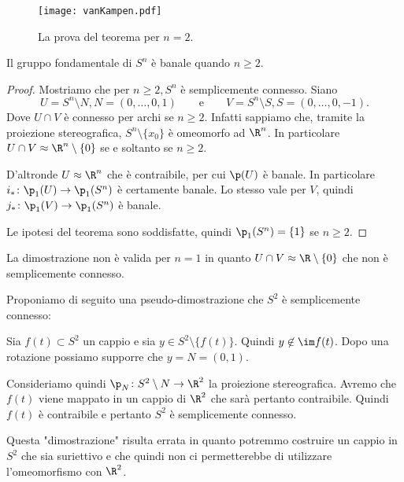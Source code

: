 \begin{figure}[tp]
	\begin{centering}
		\texttt{[image: vanKampen.pdf]}
		\caption{La prova del teorema per \(n=2\).}
		\label{fig:vanKampen}
	\end{centering}
\end{figure}

\begin{cor}
	Il gruppo fondamentale di \(S^n\) è banale quando \(n\ge 2\).
\end{cor}

\begin{proof}
	Mostriamo che per \(n\ge 2,S^n\) è semplicemente connesso.
	Siano
	\[
		U=S^n\setminus N,N=(0,\ldots,0,1) \qquad\text{e}\qquad V=S^n\setminus S, S=(0,\ldots,0,-1).
	\]
	Dove \(U\cap V\) è connesso per archi se \(n\ge 2\).
	Infatti sappiamo che, tramite la proiezione stereografica, \(S^n\setminus\{x_0\}\) è omeomorfo ad \(\R^n\).
	In particolare \(U\cap V \approx \R^n\setminus\{0\}\) se e soltanto se \(n\ge 2\).

	D'altronde \(U\approx \R^n\) che è contraibile, per cui \(\p(U)\) è banale.
	In particolare \(i_* \colon \p_1(U) \to \p_1(S^n)\) è certamente banale.
	Lo stesso vale per \(V\), quindi \(j_*\colon \p_1(V) \to \p_1(S^n)\) è banale.

	Le ipotesi del teorema sono soddisfatte, quindi \(\p_1(S^n)=\{1\}\) se \(n\ge 2\).
\end{proof}

\begin{oss}
	La dimostrazione non è valida per \(n=1\) in quanto \(U\cap V \approx \R\setminus\{0\}\) che non è semplicemente connesso.
\end{oss}

\begin{oss}
	Proponiamo di seguito una pseudo-dimostrazione che \(S^2\) è semplicemente connesso:

	Sia \(f(t)\subset S^2\) un cappio e sia \(y\in S^2\setminus\{f(t)\}\).
	Quindi \(y\not\in \im f(t)\).
	Dopo una rotazione possiamo supporre che \(y=N=(0,1)\).

	Consideriamo quindi \(\p_N \colon S^2\setminus N \to \R^2\) la proiezione stereografica.
	Avremo che \(f(t)\) viene mappato in un cappio di \(\R^2\) che sarà pertanto contraibile.
	Quindi \(f(t)\) è contraibile e pertanto \(S^2\) è semplicemente connesso.

	Questa "dimostrazione" risulta errata in quanto potremmo costruire un cappio in \(S^2\) che sia suriettivo e che quindi non ci permetterebbe di utilizzare l'omeomorfismo con \(\R^2\).
\end{oss}

